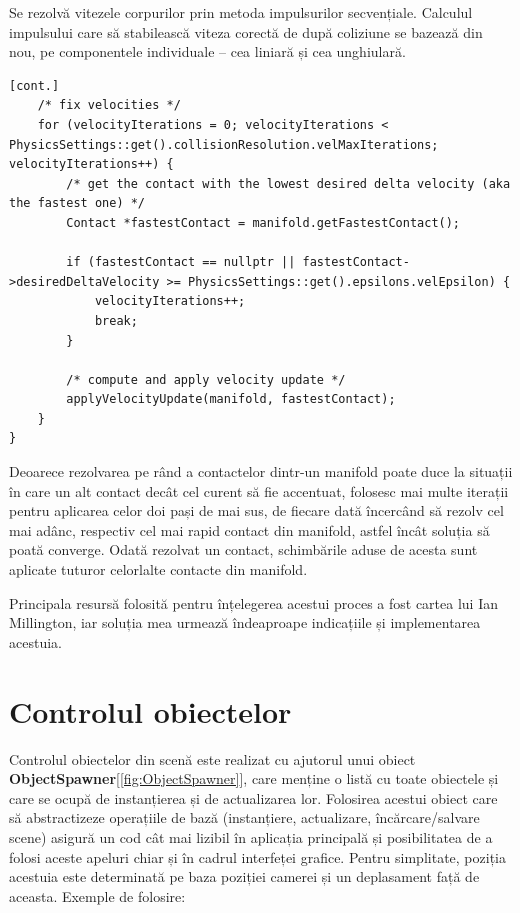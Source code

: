 \documentclass[12pt,a4paper]{report}
\begin{document}
Se rezolvă vitezele corpurilor prin metoda impulsurilor secvențiale. Calculul impulsului care să stabilească viteza corectă de după coliziune se bazează din nou, pe componentele individuale -- cea liniară și cea unghiulară.
\begin{lstlisting}[style=myC++, label={code:solveManifold_c}]
[cont.]
	/* fix velocities */
	for (velocityIterations = 0; velocityIterations < PhysicsSettings::get().collisionResolution.velMaxIterations; velocityIterations++) {
		/* get the contact with the lowest desired delta velocity (aka the fastest one) */
		Contact *fastestContact = manifold.getFastestContact();

		if (fastestContact == nullptr || fastestContact->desiredDeltaVelocity >= PhysicsSettings::get().epsilons.velEpsilon) {
			velocityIterations++;
			break;
		}

		/* compute and apply velocity update */
		applyVelocityUpdate(manifold, fastestContact);
	}
}
\end{lstlisting}

Deoarece rezolvarea pe rând a contactelor dintr-un manifold poate duce la situații în care un alt contact decât cel curent să fie accentuat, folosesc mai multe iterații pentru aplicarea celor doi pași de mai sus, de fiecare dată încercând să rezolv cel mai adânc, respectiv cel mai rapid contact din manifold, astfel încât soluția să poată converge. Odată rezolvat un contact, schimbările aduse de acesta sunt aplicate tuturor celorlalte contacte din manifold.

Principala resursă folosită pentru înțelegerea acestui proces a fost cartea\cite{millington} lui Ian Millington, iar soluția mea urmează îndeaproape indicațiile și implementarea acestuia.

\section {Controlul obiectelor}
Controlul obiectelor din scenă este realizat cu ajutorul unui obiect\textbf{ ObjectSpawner}[\autoref{fig:ObjectSpawner}], care menține o listă cu toate obiectele și care se ocupă de instanțierea și de actualizarea lor. Folosirea acestui obiect care să abstractizeze operațiile de bază (instanțiere, actualizare, încărcare/salvare scene) asigură un cod cât mai lizibil în aplicația principală și posibilitatea de a folosi aceste apeluri chiar și în cadrul interfeței grafice. Pentru simplitate, poziția acestuia este determinată pe baza poziției camerei și un deplasament față de aceasta. Exemple de folosire:
\end{document}
